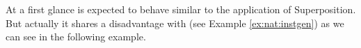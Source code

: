 

%



At a first glance \InstGenEQ is expected to behave similar to the application of Superposition. 
But actually it shares a disadvantage with \InstGen (see Example \ref{ex:nat:instgen}) as we can see in the following example.


